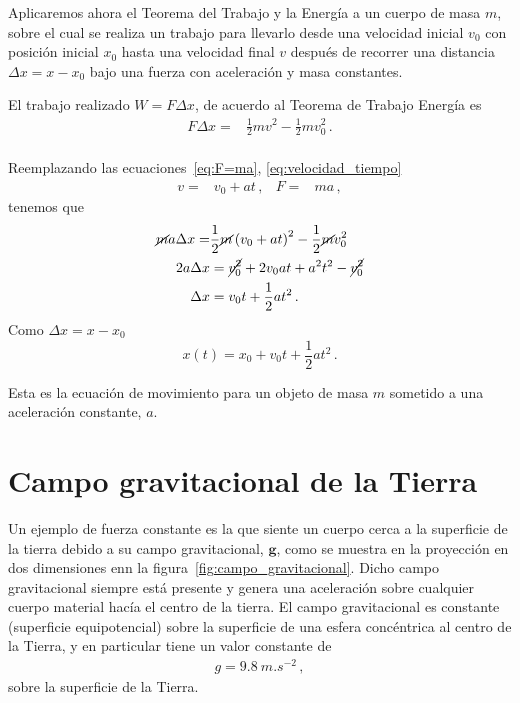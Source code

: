 \documentclass[11pt,a4paper]{book}
\begin{document}
Aplicaremos ahora el Teorema del Trabajo y la Energía 
a un cuerpo de masa $m$, sobre el cual se realiza un trabajo para llevarlo desde una velocidad inicial $v_0$ con posición inicial $x_0$ hasta una velocidad final $v$ después de recorrer una distancia $\Delta x=x-x_0$ bajo una fuerza con aceleración y masa constantes.

El trabajo realizado $W=F\Delta x$, de acuerdo al Teorema de Trabajo Energía es
\begin{align*}
    F \Delta x =& \frac{1}{2}m v^2 - \frac{1}{2}m v_0^2\,.\\
\end{align*}

Reemplazando las ecuaciones~\eqref{eq:F=ma}, \eqref{eq:velocidad_tiempo}
\begin{align}
    v=&v_0+at\,,& F=&ma\,,
\end{align}
tenemos que
\begin{align*}
    \cancel{m}a \Delta x= & \frac{1}{2}\cancel{m}\left(v_0+at\right)^2- \frac{1}{2}\cancel{m} v_0^2\\
2a\Delta x&=\cancel{v_0^2}+2v_0 a t +a^2t^2- \cancel{v_0^2}\\
\Delta x&=v_0 t +\frac{1}{2}at^2\,.\\
\end{align*}
Como $\Delta x= x-x_0$
\begin{equation}
\label{eq:movimientoparabólico}
    x(t)=x_0+v_0 t +\frac{1}{2}at^2\,.
\end{equation}

Esta es la ecuación de movimiento para un objeto de masa $m$ sometido a una aceleración constante, $a$.

\section{Campo gravitacional de la Tierra}

Un ejemplo de fuerza  constante es la que siente un cuerpo cerca a la superficie de la tierra debido a su campo gravitacional, $\boldsymbol{g}$, como se muestra en la proyección en dos dimensiones enn la figura~\ref{fig:campo_gravitacional}. Dicho campo gravitacional siempre está presente y genera una aceleración sobre cualquier cuerpo material hacía el centro de la tierra. El campo gravitacional es constante (superficie equipotencial) sobre la superficie de una esfera concéntrica al centro de la Tierra, y en particular tiene un valor constante de
 \begin{align}
 \label{eq:g}
     g = \qty{9.8}{m.s^{-2}}\,,
 \end{align}
sobre la superficie de la Tierra.
\end{document}
